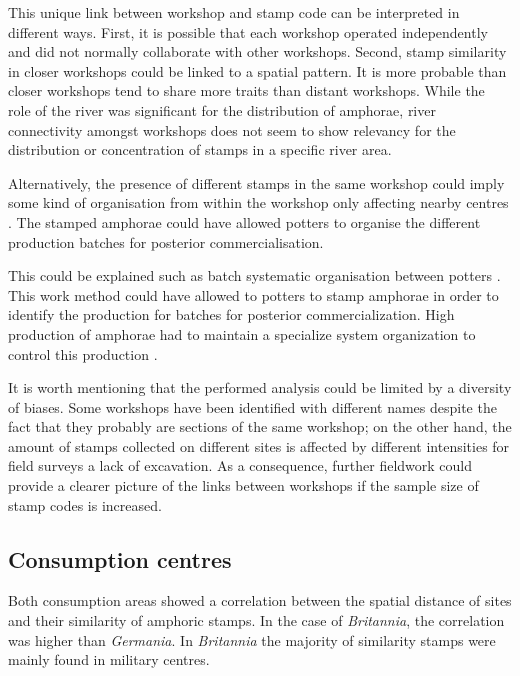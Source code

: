 \documentclass[review]{elsarticle}
\newcommand{\memo}[2]{\textcolor{#1}{#2}}
\newcommand{\xavi}[1]{\memo{magenta}{XRC: #1\\}}
\begin{document}
This unique link between workshop and stamp code can be interpreted in different ways. First, it is possible that each workshop operated independently and did not normally collaborate with other workshops.  Second, stamp similarity in closer workshops could be linked to a spatial pattern. It is more probable than closer workshops tend to share more traits than distant workshops. While the role of the river was significant for the distribution of amphorae, river connectivity amongst workshops does not seem to show relevancy for the distribution or concentration of stamps in a specific river area.

Alternatively, the presence of different stamps in the same workshop could imply some kind of organisation from within the workshop only affecting nearby centres \citep{juanmorostesis}. The stamped amphorae could have allowed potters to organise the different production batches for posterior commercialisation.

This could be explained such as batch systematic organisation between potters \citep{juanmorostesis}. This work method could have allowed to potters to stamp amphorae in order to identify the production for batches for posterior commercialization. High production of amphorae had to maintain a specialize system organization to control this production \citep[104]{juanmorostesis}.


It is worth mentioning that the performed analysis could be limited by a diversity of biases. Some workshops have been identified with different names despite the fact that they probably are sections of the same workshop; on the other hand, the amount of stamps collected on different sites is affected by different intensities for field surveys a lack of excavation. As a consequence, further fieldwork could provide a clearer picture of the links between workshops if the sample size of stamp codes is increased.

\subsection{Consumption centres}

Both consumption areas showed a correlation between the spatial distance of sites and their similarity of amphoric stamps. In the case of  \textit{Britannia}, the correlation was higher than \textit{Germania}. In \textit{Britannia} the majority of similarity stamps were mainly found in military centres.  
\end{document}

